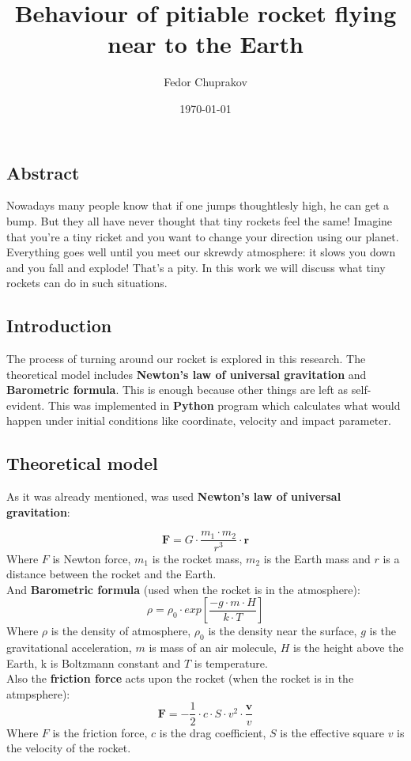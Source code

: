 \documentclass[a4paper,12pt]{article}
\author{Fedor Chuprakov}
\title{Behaviour of pitiable rocket flying near to the Earth}
\date{\today}
\begin{document}
\maketitle
\newpage
\subsection*{Abstract}
Nowadays many people know that if one jumps thoughtlesly high, he can get a 
bump. But they all have never thought that tiny rockets feel the same! Imagine that
you're a tiny ricket and you want to change your direction using our planet.
Everything goes well until you meet our skrewdy atmosphere: it slows you down and you fall and explode! That's a pity. In this work we will discuss what tiny rockets can do in such situations.
\subsection*{Introduction}
The process of turning around our rocket is explored in this research.
The theoretical model includes \textbf{Newton's law of universal gravitation
} and \textbf{Barometric formula}. This is enough because other things are left as self-evident. This was implemented in \textbf{Python} program which calculates what would happen under initial conditions like coordinate, velocity and impact parameter.
\subsection*{Theoretical model}
As it was already mentioned, was used \textbf{Newton's law of universal gravitation}:

\begin{equation}\label{Newton}
	\textbf{F}=G\cdot \frac{m_1\cdot m_2}{r^3} \cdot \textbf{r}
\end{equation}
Where \textit{$F$} is Newton force, \textit{$m_1$} is the rocket mass, \textit{$m_2$} is the Earth mass and \textit{$r$} is a distance between the rocket and the Earth.\\
And \textbf{Barometric formula} (used when the rocket is in the atmosphere):
\begin{equation}\label{Barometric}
	\rho = \rho_0 \cdot exp \left[ \frac{-g \cdot m \cdot H}{k \cdot T} \right]
\end{equation}
Where \textit{$\rho$} is the density of atmosphere, \textit{$\rho_0$} is the density near the surface, \textit{$g$} is the gravitational acceleration, \textit{$m$} is mass of an air molecule, \textit{$H$} is the height above the Earth, k is Boltzmann constant and \textit{$T$} is temperature.\\
Also the \textbf{friction force} acts upon the rocket (when the rocket is in the atmpsphere):
\begin{equation}\label{Resistance}
	\textbf{F} = -\frac{1}{2} \cdot c \cdot S \cdot v^2 \cdot \frac{\textbf{v}}{v}
\end{equation}
Where \textit{$F$} is the friction force, \textit{$c$} is the drag coefficient, \textit{$S$} is the effective square \textit{$v$} is the velocity of the rocket.
\end{document}
